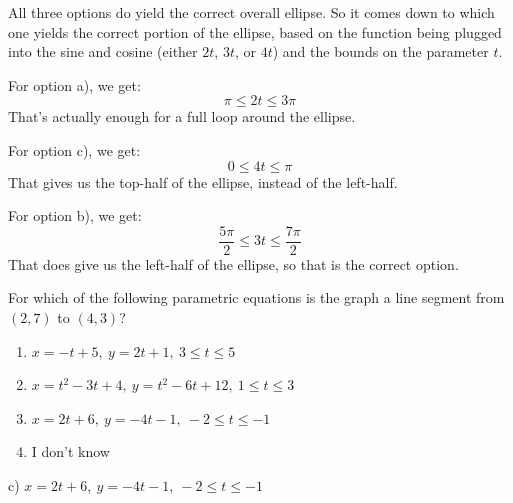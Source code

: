 \documentclass[addpoints,12pt,answers]{exam}
\begin{document}
\begin{questions}
\begin{solution}
    All three options do yield the correct overall ellipse. So it comes down to which one yields the correct portion of the ellipse, based on the function being plugged into the sine and cosine (either $2t$, $3t$, or $4t$) and the bounds on the parameter $t$.
    
    For option a), we get:
    $$\pi\le 2t\le 3\pi$$
    That's actually enough for a full loop around the ellipse.
    
    For option c), we get:
    $$0\le 4t\le\pi$$
    That gives us the top-half of the ellipse, instead of the left-half.
    
    For option b), we get:
    $$\frac{5\pi}{2}\le 3t\le\frac{7\pi}{2}$$
    That does give us the left-half of the ellipse, so that is the correct option.
  \end{solution}
  \newpage
  \question
  For which of the following parametric equations is the graph a line segment from $(2,7)$ to $(4,3)$?
  \begin{enumerate}[label=\alph*)]
    \item
    $x=-t+5, \ y=2t+1, \ 3\le t\le 5$
    \item
    $x=t^2-3t+4, \ y=t^2-6t+12, \ 1\le t\le 3$
    \item
    $x=2t+6, \ y=-4t-1, \ -2\le t\le -1$
    \item
    I don't know
  \end{enumerate}
  \begin{solution}
    c) $x=2t+6, \ y=-4t-1, \ -2\le t\le -1$
    

\end{solution}
\end{questions}
\end{document}
